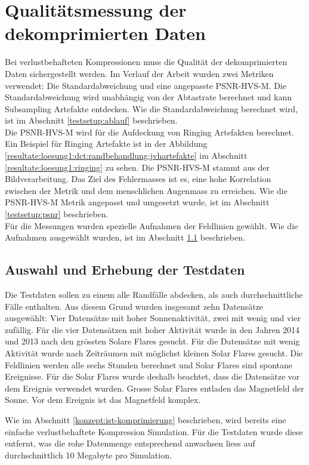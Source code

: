 \section{Qualitätsmessung der dekomprimierten Daten} \label{testsetup}
Bei verlustbehafteten Kompressionen muss die Qualität der dekomprimierten Daten sichergestellt werden. Im Verlauf der Arbeit wurden zwei Metriken verwendet: Die Standardabweichung und eine angepasste PSNR-HVS-M. Die Standardabweichung wird unabhängig von der Abtastrate berechnet und kann Subsampling Artefakte entdecken. Wie die Standardabweichung berechnet wird, ist im Abschnitt \ref{testsetup:ablauf} beschrieben.\\
Die PSNR-HVS-M wird für die Aufdeckung von Ringing Artefakten \cite{wiki:ringing:artefacts} berechnet. Ein Beispiel für Ringing Artefakte ist in der Abbildung \ref{resultate:loesung1:dct:randbehandlung:jvhartefakte} im Abschnitt \ref{resultate:loesung1:ringing} zu sehen. Die PSNR-HVS-M stammt aus der Bildverarbeitung. Das Ziel des Fehlermasses ist es, eine hohe Korrelation zwischen der Metrik und dem menschlichen Augenmass zu erreichen. Wie die PSNR-HVS-M Metrik angepasst und umgesetzt wurde, ist im Abschnitt \ref{testsetup:psnr} beschrieben.\\
Für die Messungen wurden spezielle Aufnahmen der Feldlinien gewählt. Wie die Aufnahmen ausgewählt wurden, ist im Abschnitt \ref{testsetup:auswahl_erhebung} beschrieben.

\subsection{Auswahl und Erhebung der Testdaten}\label{testsetup:auswahl_erhebung}
Die Testdaten sollen zu einem alle Randfälle abdecken, als auch durchschnittliche Fälle enthalten. Aus diesem Grund wurden insgesamt zehn Datensätze ausgewählt: Vier Datensätze mit hoher Sonnenaktivität, zwei mit wenig und vier zufällig. Für die vier Datensätzen mit hoher Aktivität wurde in den Jahren 2014 und 2013 nach den grössten Solare Flares gesucht. Für die Datensätze mit wenig Aktivität wurde nach Zeiträumen mit möglichst kleinen Solar Flares gesucht.
Die Feldlinien werden alle sechs Stunden berechnet und Solar Flares sind spontane Ereignisse. Für die Solar Flares wurde deshalb beachtet, dass die Datensätze vor dem Ereignis verwendet wurden. Grosse Solar Flares entladen das Magnetfeld der Sonne. Vor dem Ereignis ist das Magnetfeld komplex.

Wie im Abschnitt \ref{konzept:ist-komprimierung} beschrieben, wird bereits eine einfache verlustbehaftete Kompression Simulation. Für die Testdaten wurde diese entfernt, was die rohe Datenmenge entsprechend anwachsen liess auf durchschnittlich 10 Megabyte pro Simulation.

